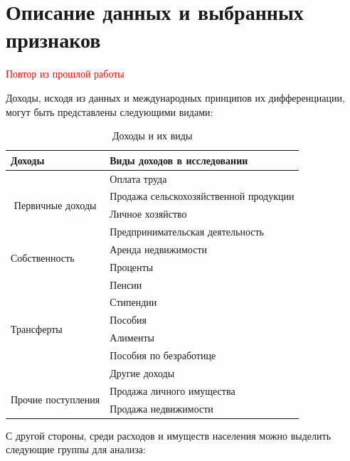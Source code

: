 \documentclass[12pt]{report}
\begin{document}
\section{Описание данных и выбранных признаков}
\par
\textcolor{red}{Повтор из прошлой работы}
\par
Доходы, исходя из данных и международных принципов их дифференциации, могут быть представлены следующими видами:
\begin{table}[H]
    \centering
    \begin{tabular}{|l|l|}
        \hline
        Доходы                                                  & Виды доходов в исследовании            \\ \hline
        \multicolumn{1}{|c|}{\multirow{4}{*}{Первичные доходы}} & Оплата труда                           \\ \cline{2-2} 
        \multicolumn{1}{|c|}{}                                  & Продажа сельскохозяйственной продукции \\ \cline{2-2} 
        \multicolumn{1}{|c|}{}                                  & Личное хозяйство                       \\ \cline{2-2} 
        \multicolumn{1}{|c|}{}                                  & Предпринимательская деятельность       \\ \hline
        \multirow{2}{*}{Собственность}                          & Аренда недвижимости                    \\ \cline{2-2} 
                                                                & Проценты                               \\ \hline
        \multirow{6}{*}{Трансферты}                             & Пенсии                                 \\ \cline{2-2} 
                                                                & Стипендии                              \\ \cline{2-2} 
                                                                & Пособия                                \\ \cline{2-2} 
                                                                & Алименты                               \\ \cline{2-2} 
                                                                & Пособия по безработице                 \\ \cline{2-2} 
                                                                & Другие доходы                          \\ \hline
        \multirow{2}{*}{Прочие поступления}                     & Продажа личного имущества              \\ \cline{2-2} 
                                                                & Продажа недвижимости                   \\ \hline
        \end{tabular}
\caption{Доходы и их виды}
\end{table}
\par
С другой стороны, среди расходов и имуществ населения можно выделить следующие группы для анализа:
\end{document}

